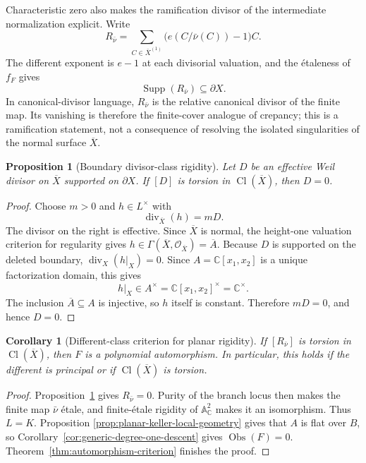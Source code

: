 \documentclass[11pt]{article}
\newtheorem{proposition}[theorem]{Proposition}
\newtheorem{corollary}[theorem]{Corollary}
\theoremstyle{remark}
\theoremstyle{definition}
\newcommand{\A}{\mathbb A}
\newcommand{\C}{\mathbb C}
\newcommand{\Obs}{\operatorname{Obs}}
\begin{document}
Characteristic zero also makes the ramification divisor of the intermediate
normalization explicit.  Write
\[
  R_{\bar\nu}
  =
  \sum_{C\in\overline X^{(1)}}
    \bigl(e(C/\bar\nu(C))-1\bigr)C.
\]
The different exponent is \(e-1\) at each divisorial valuation, and the
\'etaleness of \(f_F\) gives
\[
  \operatorname{Supp}(R_{\bar\nu})\subseteq\partial X.
\]
In canonical-divisor language, \(R_{\bar\nu}\) is the relative canonical
divisor of the finite map.  Its vanishing is therefore the finite-cover
analogue of crepancy; this is a ramification statement, not a consequence
of resolving the isolated singularities of the normal surface
\(\overline X\).

\begin{proposition}[Boundary divisor-class rigidity]
\label{prop:boundary-divisor-class-rigidity}
Let \(D\) be an effective Weil divisor on \(\overline X\) supported on
\(\partial X\).  If \([D]\) is torsion in
\(\operatorname{Cl}(\overline X)\), then \(D=0\).
\end{proposition}

\begin{proof}
Choose \(m>0\) and \(h\in L^\times\) with
\[
  \operatorname{div}_{\overline X}(h)=mD.
\]
The divisor on the right is effective.  Since \(\overline X\) is normal,
the height-one valuation criterion for regularity gives
\(h\in\Gamma(\overline X,\mathcal O_{\overline X})=\overline A\).
Because \(D\) is supported on the deleted boundary,
\(\operatorname{div}_{X}(h|_X)=0\).  Since
\(A=\C[x_1,x_2]\) is a unique factorization domain, this gives
\[
  h|_X\in A^\times
  =\C[x_1,x_2]^\times
  =\C^\times.
\]
The inclusion \(\overline A\subseteq A\) is injective, so \(h\) itself is
constant.  Therefore \(mD=0\), and hence \(D=0\).
\end{proof}

\begin{corollary}[Different-class criterion for planar rigidity]
\label{cor:different-class-planar-rigidity}
If \([R_{\bar\nu}]\) is torsion in
\(\operatorname{Cl}(\overline X)\), then \(F\) is a polynomial
automorphism.  In particular, this holds if the different is principal or
if \(\operatorname{Cl}(\overline X)\) is torsion.
\end{corollary}

\begin{proof}
Proposition~\ref{prop:boundary-divisor-class-rigidity} gives
\(R_{\bar\nu}=0\).  Purity of the branch locus then makes the finite map
\(\bar\nu\) \'etale, and finite-\'etale rigidity of \(\A^2_{\C}\) makes it
an isomorphism.  Thus \(L=K\).  Proposition
\ref{prop:planar-keller-local-geometry} gives that \(A\) is flat over
\(B\), so Corollary~\ref{cor:generic-degree-one-descent} gives
\(\Obs(F)=0\).  Theorem~\ref{thm:automorphism-criterion} finishes the
proof.
\end{proof}
\end{document}
